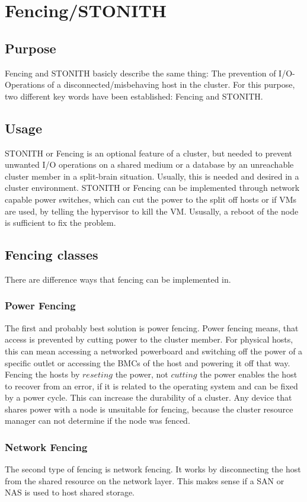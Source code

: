 

\section{Fencing/STONITH}
\subsection{Purpose}
Fencing and STONITH basicly describe the same thing: The prevention of I/O-Operations of a disconnected/misbehaving host in the cluster.
For this purpose, two different key words have been established: Fencing and \ac{STONITH}.
\subsection{Usage}
STONITH or Fencing is an optional feature of a cluster, but needed
to prevent unwanted I/O operations on a shared medium or a database
by an unreachable cluster member in a split-brain situation. Usually, this is needed
and desired in a cluster environment. STONITH or Fencing can be implemented
through network capable power switches, which can cut the power to the split off hosts or
if \acp{VM} are used, by telling the hypervisor to kill the \ac{VM}.
Ususally, a reboot of the node is sufficient to fix the problem.

\subsection{Fencing classes}
There are difference ways that fencing can be implemented in.
\subsubsection{Power Fencing}
The first and probably best solution is power fencing.
Power fencing means, that access is prevented by cutting power to the cluster member.
For physical hosts, this can mean accessing a networked powerboard and switching
off the power of a specific outlet or accessing the \acp{BMC} of the host
and powering it off that way. Fencing the hosts by $reseting$ the power, not $cutting$
the power enables the host to recover from an error, if it is related to the operating
system and can be fixed by a power cycle. This can increase the durability of a cluster.
Any device that shares power with a node is unsuitable for fencing, because the
cluster resource manager can not determine if the node was fenced.
\subsubsection{Network Fencing}
The second type of fencing is network fencing. It works by disconnecting the host
from the shared resource on the network layer. This makes sense if a \ac{SAN} or \ac{NAS}
is used to host shared storage.
